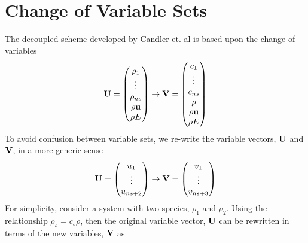 \section{Change of Variable Sets}
\label{change-of-var-section}

The decoupled scheme developed by Candler et. al\cite{candler} is based upon the
change of variables
\begin{equation}
  \mathbf U = \begin{pmatrix}
    \rho_1 \\
    \vdots \\
    \rho_{ns} \\
    \rho \mathbf u \\
    \rho E
  \end{pmatrix}
  \rightarrow
  \mathbf V = \begin{pmatrix}
    c_1 \\
    \vdots \\
    c_{ns} \\
    \rho \\
    \rho \mathbf u \\
    \rho E
  \end{pmatrix}
  \label{var-sets}
\end{equation}
To avoid confusion between variable sets, we re-write the variable vectors,
$\mathbf U$ and $\mathbf V$, in a more generic sense
\begin{equation}
  \mathbf U = \begin{pmatrix}
    u_1 \\
    \vdots \\
    u_{ns + 2}
  \end{pmatrix}
  \rightarrow
  \mathbf V = \begin{pmatrix}
    v_1 \\
    \vdots \\
    v_{ns + 3}
  \end{pmatrix}
  \label{generic-var-sets}
\end{equation}
For simplicity, consider a system with two species, $\rho_1$ and $\rho_2$.
Using the relationship $\rho_s = c_s \rho$, then the original variable vector,
$\mathbf U$ can be rewritten in terms of the new variables, $\mathbf V$ as
